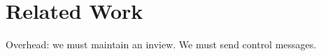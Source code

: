 
\section{Related Work}
\label{sec:relatedwork}

Overhead: we must maintain an inview. We must send control messages. 

